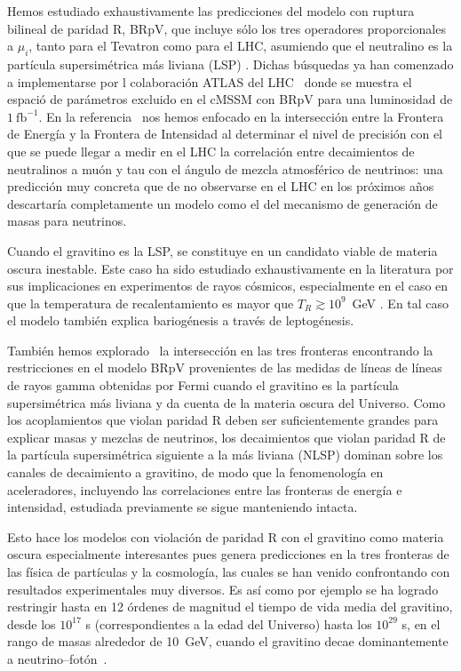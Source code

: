 Hemos estudiado exhaustivamente las predicciones del modelo con
ruptura bilineal de paridad R, BRpV, que incluye sólo los tres
operadores proporcionales a $\mu_i$, tanto para el Tevatron como
para el LHC, asumiendo que el neutralino es la partícula
supersimétrica más liviana (LSP)
\cite{Magro:2003zb,deCampos:2005ri,deCampos:2007bn,deCampos:2008ic,deCampos:2008re,DeCampos:2010yu}. Dichas
búsquedas ya han comenzado a implementarse por l colaboración ATLAS
del LHC~\cite{:2011iu} donde se muestra el espació de parámetros
excluido en el cMSSM con BRpV para una luminosidad de $1\
\text{fb}^{-1}$.  En la referencia~\cite{DeCampos:2010yu} nos hemos enfocado en la
intersección entre la Frontera de Energía y la Frontera de Intensidad
al determinar el nivel de precisión con el que se puede llegar a medir
en el LHC la correlación entre decaimientos de neutralinos a muón y
tau con el ángulo de mezcla atmosférico de neutrinos: una predicción
muy concreta que de no observarse en el LHC en los próximos años
descartaría completamente un modelo como el del mecanismo de generación de
masas para neutrinos. 

Cuando el gravitino es la LSP, se constituye en un candidato viable de
materia oscura inestable. Este caso ha sido estudiado exhaustivamente
en la literatura por sus implicaciones en experimentos de rayos
cósmicos, especialmente en el caso en que la temperatura de recalentamiento es mayor que $T_R\gtrsim 10^9$~GeV 
\cite{Takayama:2000uz,Buchmuller:2007ui,Bertone:2007aw,Ibarra:2007wg,Ishiwata:2008cu,Covi:2008jy,Ibarra:2008qg}. 
En tal caso el modelo también explica bariogénesis a través de leptogénesis. 


También hemos explorado~\cite{Restrepo:2011rj} la intersección en
las tres fronteras encontrando la restricciones en el modelo BRpV
provenientes de las medidas de líneas de líneas de rayos gamma
obtenidas por Fermi cuando el gravitino es la partícula
supersimétrica más liviana y da cuenta de la materia oscura del
Universo. Como los acoplamientos que violan paridad R deben ser
suficientemente grandes para explicar masas y mezclas de neutrinos,
los decaimientos que violan paridad R de la partícula supersimétrica
siguiente a la más liviana (NLSP) dominan sobre los canales de
decaimiento a gravitino, de modo que la fenomenología en aceleradores,
incluyendo las correlaciones entre las fronteras de energía e
intensidad, estudiada previamente se sigue manteniendo intacta.

Esto hace los modelos con violación de paridad R con el gravitino como
materia oscura especialmente interesantes pues genera predicciones en
la tres fronteras de las física de partículas y la cosmología, las
cuales se han venido confrontando con resultados experimentales
muy diversos. Es así como por ejemplo se ha logrado restringir hasta
en 12 órdenes de magnitud el tiempo de vida media del gravitino, desde
los $10^{17}$ s (correspondientes a la edad del Universo) hasta los
$10^{29}$ s, en el rango de masas alrededor de 10~GeV, cuando el
gravitino decae dominantemente a neutrino--fotón~\cite{Vertongen:2011mu}.  

